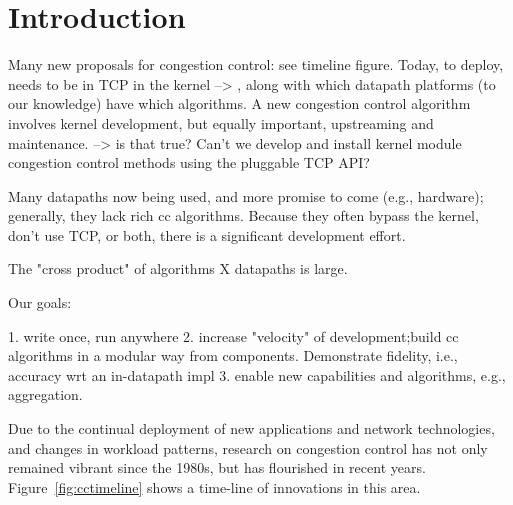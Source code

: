 \section{Introduction}



Many new proposals for congestion control: see timeline figure. Today, to deploy, needs to be in TCP in the kernel --> , along with which datapath platforms (to our knowledge) have which algorithms. A new congestion control algorithm involves kernel development, but equally important, upstreaming and maintenance. --> is that true? Can't we develop and install kernel module congestion control methods using the pluggable TCP API?

Many datapaths now being used, and more promise to come (e.g., hardware); generally, they lack rich cc algorithms. Because they often bypass the kernel, don't use TCP, or both, there is a significant development effort.

The "cross product" of algorithms X datapaths is large.

Our goals: 

1. write once, run anywhere
2. increase "velocity" of development;build cc algorithms in a modular way from components. Demonstrate fidelity, i.e., accuracy wrt an in-datapath impl
3. enable new capabilities and algorithms, e.g., aggregation. 

\fi

Due to the continual deployment of new applications and network technologies, and changes in workload patterns, research on congestion control has not only remained vibrant since the 1980s, but has flourished in recent years. Figure~\ref{fig:cctimeline} shows a time-line of innovations in this area. 

